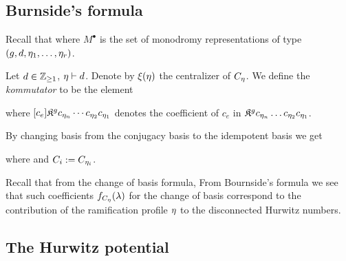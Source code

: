 \documentclass[10pt]{beamer}
\begin{document}
\subsection{Burnside's formula}

\begin{frame}

Recall that 
\vspace{-3mm}
where $M^\bullet$ is the set of monodromy representations of type $(g,d,\eta_1,\ldots,\eta_r)$.
\begin{definition}
	Let $d\in\mathbb Z_{\geq1}$, $\eta\vdash d$. Denote by $\xi(\eta)$ the centralizer of $C_\eta$. We define the \emph{kommutator} to be the element
\end{definition}

\begin{theorem}
	where $[c_e]\mathfrak K^gc_{\eta_n}\cdots c_{\eta_2}c_{\eta_1}$ denotes the coefficient of $c_e$ in $\mathfrak K^gc_{\eta_n}\ldots c_{\eta_2}c_{\eta_1}$.
\end{theorem}
\end{frame}

\begin{frame}

By changing basis from the conjugacy basis to the idempotent basis we get

\begin{theorem}
	where
	and $C_i:=C_{\eta_i}$.
\end{theorem}

Recall that from the change of basis formula, 
From Bournside's formula we see that such coefficients $f_{C_\eta}(\lambda)$ for the change of basis correspond to the contribution of the ramification profile $\eta$ to the disconnected Hurwitz numbers. 

\end{frame}

\subsection{The Hurwitz potential}
\end{document}
